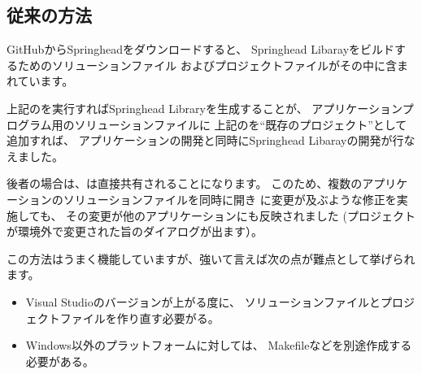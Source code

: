 \subsection{従来の方法}
\label{subsec:ConventionalMethod}

\noindent
GitHubからSpringheadをダウンロードすると、
Springhead Libarayをビルドするためのソリューションファイル
およびプロジェクトファイルがその中に含まれています。

\medskip
\begin{narrow}
    \begin{narrow}\begin{minipage}{\textwidth}
	\medskip
  \end{minipage}\end{narrow}
\end{narrow}

上記の\SolutionFile を実行すればSpringhead Libraryを生成することが、
アプリケーションプログラム用のソリューションファイルに
上記の\ProjectFile を``既存のプロジェクト''として追加すれば、
アプリケーションの開発と同時にSpringhead Libarayの開発が行なえました。

後者の場合は、\ProjectFile は直接共有されることになります。
このため、複数のアプリケーションのソリューションファイルを同時に開き
\ProjectFile に変更が及ぶような修正を実施しても、
その変更が他のアプリケーションにも反映されました
(プロジェクトが環境外で変更された旨のダイアログが出ます）。

\medskip
この方法はうまく機能していますが、強いて言えば次の点が難点として挙げられます。
\begin{itemize}
  \item	Visual Studioのバージョンが上がる度に、
	ソリューションファイルとプロジェクトファイルを作り直す必要がる。
  \item	Windows以外のプラットフォームに対しては、
	Makefileなどを別途作成する必要がある。
\end{itemize}

